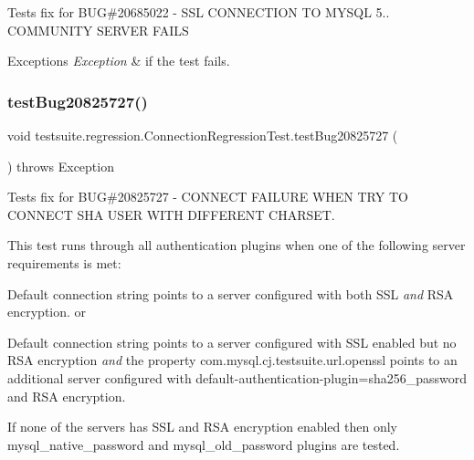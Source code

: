 Tests fix for B\+UG\#20685022 -\/ S\+SL C\+O\+N\+N\+E\+C\+T\+I\+ON TO M\+Y\+S\+QL 5.. C\+O\+M\+M\+U\+N\+I\+TY S\+E\+R\+V\+ER F\+A\+I\+LS


\begin{DoxyExceptions}{Exceptions}
{\em Exception} & if the test fails. \\
\hline
\end{DoxyExceptions}
\mbox{\label{classtestsuite_1_1regression_1_1_connection_regression_test_a90f5472dadf388f9b00461fc39ddeb21}} 
\subsubsection{\texorpdfstring{test\+Bug20825727()}{testBug20825727()}}
{\footnotesize\ttfamily void testsuite.\+regression.\+Connection\+Regression\+Test.\+test\+Bug20825727 (\begin{DoxyParamCaption}{ }\end{DoxyParamCaption}) throws Exception}

Tests fix for B\+UG\#20825727 -\/ C\+O\+N\+N\+E\+CT F\+A\+I\+L\+U\+RE W\+H\+EN T\+RY TO C\+O\+N\+N\+E\+CT S\+HA U\+S\+ER W\+I\+TH D\+I\+F\+F\+E\+R\+E\+NT C\+H\+A\+R\+S\+ET.

This test runs through all authentication plugins when one of the following server requirements is met\+:
\begin{DoxyEnumerate}
\item Default connection string points to a server configured with both S\+SL {\itshape and} R\+SA encryption. or
\item Default connection string points to a server configured with S\+SL enabled but no R\+SA encryption {\itshape and} the property com.\+mysql.\+cj.\+testsuite.\+url.\+openssl points to an additional server configured with default-\/authentication-\/plugin=sha256\+\_\+password and R\+SA encryption.
\end{DoxyEnumerate}

If none of the servers has S\+SL and R\+SA encryption enabled then only \textquotesingle{}mysql\+\_\+native\+\_\+password\textquotesingle{} and \textquotesingle{}mysql\+\_\+old\+\_\+password\textquotesingle{} plugins are tested.


